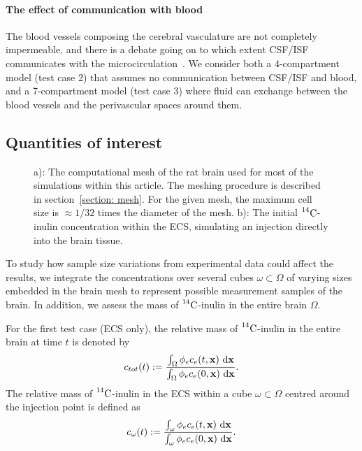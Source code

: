 \documentclass[a4paper,11pt]{article}
\newcommand{\1}{^{(1)}}
\newcommand{\2}{^{(2)}}
\newcommand*{\dd}{\mathop{\kern0pt\mathrm{d}}\!{}}
\newcommand {\x}   {\mathbf{x}}
\newcommand{\Cinulin}{$\prescript{14}{}{\text{C}}$-inulin }
\begin{document}
\paragraph{The effect of communication with blood}
The blood vessels composing the cerebral vasculature are not completely impermeable, and there is a debate going on to which extent CSF/ISF communicates with the microcirculation~\cite{Oreskovic-2010-formation}. We consider both a 4-compartment model (test case 2) that assumes no communication between CSF/ISF and blood, and a 7-compartment model (test case 3) where fluid can exchange between the blood vessels and the perivascular spaces around them. 



\subsection{Quantities of interest}


\begin{figure}[htb]
    \centering

    \hfill
    \caption{a): The computational mesh of the rat brain used for most of the simulations within this article. The meshing procedure is described in section~\ref{section: mesh}. For the given mesh, the maximum cell size is $\approx 1/32$ times the diameter of the mesh. b): The initial \Cinulin concentration within the ECS, simulating an injection directly into the brain tissue.}
    \label{fig:mesh-illustration}
\end{figure}

To study how sample size variations from experimental data could affect the results, we integrate the concentrations over several cubes $\omega \subset \Omega$ of varying sizes embedded in the brain mesh to represent possible measurement samples of the brain. In addition, we assess the mass of \Cinulin in the entire brain $\Omega$. 

For the first test case (ECS only), the relative mass of \Cinulin in the entire brain at time $t$ is denoted by 
\[
c_{tot}(t) := \frac{\int_\Omega \phi_e c_e(t,\x) \, \dd \x }{ \int_\Omega \phi_e c_e(0,\x) \, \dd \x}.
\]
The relative mass of \Cinulin in the ECS within a cube $\omega \subset \Omega$ centred around the injection point is defined as
\[
c_{\omega}(t) :=  \frac{\int_{\omega}  \phi_e c_e(t,\x) \, \dd \x }{\int_\omega  \phi_e c_e(0,\x) \, \dd \x}.  
\]
\end{document}
